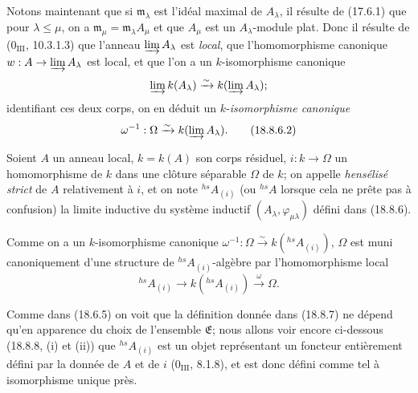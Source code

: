 \begin{env}[18.8.6]
Notons maintenant que si $\mathfrak m_\lambda$ est l'idéal maximal de $A_\lambda$, il résulte de (17.6.1) que pour $\lambda\leq\mu$, on a $\mathfrak m_\mu=\mathfrak m_\lambda A_\mu$ et que $A_\mu$ est un $A_\lambda$-module plat. Donc il résulte de ($0_{\mathrm{III}}$, 10.3.1.3) que l'anneau $\varinjlim A_\lambda$ est \emph{local}, que l'homomorphisme canonique $w:A\to\varinjlim A_\lambda$ est local, et que l'on a un $k$-isomorphisme canonique
\[
  \varinjlim k(A_\lambda)\xrightarrow{\sim}k(\varinjlim A_\lambda);
\]
identifiant ces deux corps, on en déduit un $k$-\emph{isomorphisme canonique}
\begin{equation}
  \omega^{-1}:\Omega\xrightarrow{\sim}k(\varinjlim A_\lambda).
  \label{IV.18.8.6.2}
  \tag{18.8.6.2}
\end{equation}
\end{env}

\begin{definition}[18.8.7]
\label{IV.18.8.7}
Soient $A$ un anneau local, $k=k(A)$ son corps résiduel, $i:k\to\Omega$ un homomorphisme de $k$ dans une clôture séparable $\Omega$ de $k$; on appelle \emph{hensélisé strict} de $A$ relativement à $i$, et on note ${}^{hs}\!A_{(i)}$ (ou ${}^{hs}\!A$ lorsque cela ne prête pas à confusion) la limite inductive du système inductif $(A_\lambda,\varphi_{\mu\lambda})$ défini dans (18.8.6).
\end{definition}

Comme on a un $k$-isomorphisme canonique $\omega^{-1}:\Omega\xrightarrow{\sim}k({}^{hs}\!A_{(i)})$, $\Omega$ est muni canoniquement d'une structure de ${}^{hs}\!A_{(i)}$-algèbre par l'homomorphisme local
\[
  {}^{hs}\!A_{(i)}\longrightarrow k({}^{hs}\!A_{(i)})\xrightarrow{\omega}\Omega.
\]

Comme dans (18.6.5) on voit que la définition donnée dans (18.8.7) ne dépend qu'en apparence du choix de l'ensemble $\mathfrak E$; nous allons voir encore ci-dessous (18.8.8, (i) et (ii)) que ${}^{hs}\!A_{(i)}$ est un objet représentant un foncteur entièrement défini par la donnée de $A$ et de $i$ ($0_{\mathrm{III}}$, 8.1.8), et est donc défini comme tel à isomorphisme unique près.

